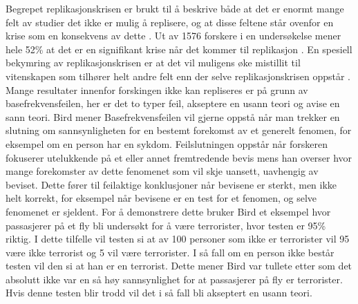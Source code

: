 \documentclass[
]{book}
\begin{document}
Begrepet replikasjonskrisen er brukt til å beskrive både at det er enormt mange felt av studier det ikke er mulig å replisere, og at disse feltene står ovenfor en krise som en konsekvens av dette \citet{bird2020}.
Ut av 1576 forskere i en undersøkelse mener hele 52\% at det er en signifikant krise når det kommer til replikasjon \citet{baker2016} .
En spesiell bekymring av replikasjonskrisen er at det vil muligens øke mistillit til vitenskapen som tilhører helt andre felt enn der selve replikasjonskrisen oppstår \citet{bird2020}.\\
Mange resultater innenfor forskingen ikke kan repliseres er på grunn av basefrekvensfeilen, her er det to typer feil, akseptere en usann teori og avise en sann teori.
Bird \citet{bird2020} mener Basefrekvensfeilen vil gjerne oppstå når man trekker en slutning om sannsynligheten for en bestemt forekomst av et generelt fenomen, for eksempel om en person har en sykdom.
Feilslutningen oppstår når forskeren fokuserer utelukkende på et eller annet fremtredende bevis mens han overser hvor mange forekomster av dette fenomenet som vil skje uansett, uavhengig av beviset.
Dette fører til feilaktige konklusjoner når bevisene er sterkt, men ikke helt korrekt, for eksempel når bevisene er en test for et fenomen, og selve fenomenet er sjeldent.
For å demonstrere dette bruker Bird et eksempel hvor passasjerer på et fly bli undersøkt for å være terrorister, hvor testen er 95\% riktig.
I dette tilfelle vil testen si at av 100 personer som ikke er terrorister vil 95 være ikke terrorist og 5 vil være terrorister.
I så fall om en person ikke består testen vil den si at han er en terrorist.
Dette mener Bird var tullete etter som det absolutt ikke var en så høy sannsynlighet for at passasjerer på fly er terrorister.
Hvis denne testen blir trodd vil det i så fall bli akseptert en usann teori.
\end{document}
